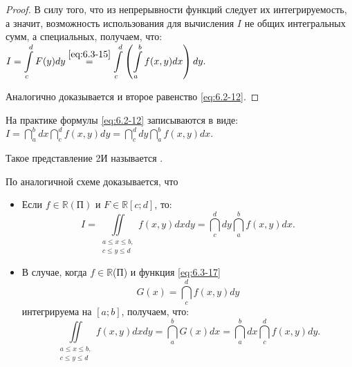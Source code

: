 \begin{proof}
	В силу того, что из непрерывности функций следует их интегрируемость, а значит, возможность использования для вычисления $I$ не общих интегральных сумм, а специальных, получаем, что:
    $
	I =  \displaystyle\int\limits_{c}^{d} F(y) dy \overset{\eqref{eq:6.3-15}}{=} \displaystyle\int\limits_c^d \left(\displaystyle\int\limits_a^b f(x,y)dx \right) dy.
    $

	Аналогично доказывается и второе равенство \eqref{eq:6.2-12}.
\end{proof}

\newpage

\begin{notes}
  \item На практике формулы \eqref{eq:6.2-12} записываются в виде:
	$ I = \dint\limits_a^b dx \dint\limits_c^d f(x, y)dy = \dint\limits_c^d dy \dint\limits_a^b f(x,y) dx$.

	Такое представление 2И называется .
  \item По аналогичной схеме доказывается, что
	\begin{itemize}
	  \item Если $f \in \mathbb{R}(\text{П})$ и $F \in \mathbb{R}[c;d]$, то:
		\begin{equation}
			\label{eq:6.3-16}
			I = \iint\limits_{\substack{a \leqslant x \leqslant b,\\ c \leqslant y \leqslant d}}
			f(x,y)dxdy = \dint\limits_c^d dy \dint\limits_a^b f(x,y) dx.
		\end{equation}
	  \item В случае, когда $f \in \mathbb{R}$(П) и функция \eqref{eq:6.3-17}
		\begin{equation}
			\label{eq:6.3-17}
			G(x) = \dint\limits_c^d f(x,y)dy
		\end{equation}
		интегрируема на $[a;b]$, получаем, что:
		\begin{equation}
			\label{eq:6.3-18}
			\iint\limits_{\substack{a \leqslant x \leqslant b, \\ c \leqslant y \leqslant d}}
			f(x,y)dxdy = \dint\limits_a^b G(x)dx = \dint\limits_a^b dx \dint\limits_c^d f(x,y)dy.
		\end{equation}
	\end{itemize}
\end{notes}

\begin{consequence}
\end{consequence}

